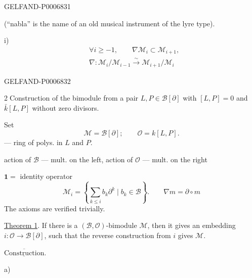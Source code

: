 \begin{GelfandAdjacentEvidence}{GELFAND-P000683}{1}

(“nabla” is the name of an old musical instrument of the lyre type).

i)
\[
\begin{aligned}
&\forall i\geq-1,\qquad\nabla\mathcal M_i\subset\mathcal M_{i+1},\\
&\nabla:\mathcal M_i/\mathcal M_{i-1}
   \overset{\sim}{\longrightarrow}\mathcal M_{i+1}/\mathcal M_i
\end{aligned}
\]
\end{GelfandAdjacentEvidence}
\begin{GelfandAdjacentEvidence}{GELFAND-P000683}{2}


\textcircled{2}\enspace Construction of the bimodule from a pair \(L,P\in\mathcal B[\partial]\)
with \([L,P]=0\) and \(\bar k[L,P]\) without zero divisors.

Set
\[
\mathcal M=\mathcal B[\partial];\qquad \mathcal O=k[L,P].
\]
--- ring of polys. in \(L\) and \(P\).

action of \(\mathcal B\) --- mult. on the left, action of \(\mathcal O\) --- mult. on the right

\(\mathbf1=\) identity operator
\[
\mathcal M_i=\left\{\sum_{k\leq i}b_k\partial^k\mid b_k\in\mathcal B\right\}.
\qquad
\nabla m=\partial\circ m
\]
The axioms are verified trivially.

\underline{Theorem 1}. If there is a \((\mathcal B,\mathcal O)\)-bimodule
\(\mathcal M\), then it gives an embedding \(i:\mathcal O\longrightarrow\mathcal B[\partial]\),
such that the reverse construction from \(i\) gives \(\mathcal M\).

\(\overline{\underline{\text{Construction}}}\).

a)
\end{GelfandAdjacentEvidence}
